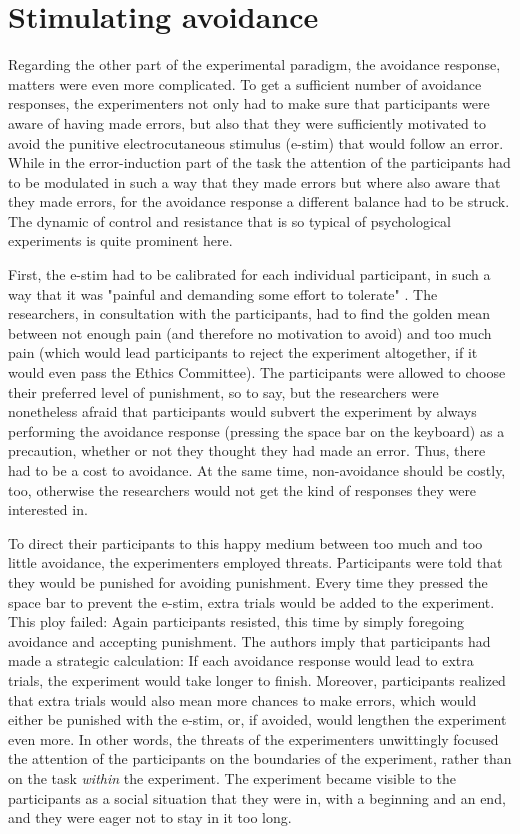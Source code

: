 \documentclass[twocolumn, serif, authordate, reflection]{jote-article}
\begin{document}
  {}\section*{Stimulating avoidance} 

Regarding the other part of the experimental paradigm, the avoidance response, matters were even more complicated. To get a sufficient number of avoidance responses, the experimenters not only had to make sure that participants were aware of having made errors, but also that they were sufficiently motivated to avoid the punitive electrocutaneous stimulus (e-stim) that would follow an error. While in the error-induction part of the task the attention of the participants had to be modulated in such a way that they made errors but where also aware that they made errors, for the avoidance response a different balance had to be struck. The dynamic of control and resistance that is so typical of psychological experiments is quite prominent here.

First, the e-stim had to be calibrated for each individual participant, in such a way that it was "painful and demanding some effort to tolerate" \parencite[p.29]{Traxler2020}. The researchers, in consultation with the participants, had to find the golden mean between not enough pain (and therefore no motivation to avoid) and too much pain (which would lead participants to reject the experiment altogether, if it would even pass the Ethics Committee). The participants were allowed to choose their preferred level of punishment, so to say, but the researchers were nonetheless afraid that participants would subvert the experiment by always performing the avoidance response (pressing the space bar on the keyboard) as a precaution, whether or not they thought they had made an error. Thus, there had to be a cost to avoidance. At the same time, non-avoidance should be costly, too, otherwise the researchers would not get the kind of responses they were interested in.

To direct their participants to this happy medium between too much and too little avoidance, the experimenters employed threats. Participants were told that they would be punished for avoiding punishment. Every time they pressed the space bar to prevent the e-stim, extra trials would be added to the experiment. This ploy failed: Again participants resisted, this time by simply foregoing avoidance and accepting punishment. The authors imply that participants had made a strategic calculation: If each avoidance response would lead to extra trials, the experiment would take longer to finish. Moreover, participants realized that extra trials would also mean more chances to make errors, which would either be punished with the e-stim, or, if avoided, would lengthen the experiment even more. In other words, the threats of the experimenters unwittingly focused the attention of the participants on the boundaries of the experiment, rather than on the task \emph{within}
the experiment. The experiment became visible to the participants as a social situation that they were in, with a beginning and an end, and they were eager not to stay in it too long.
\end{document}
